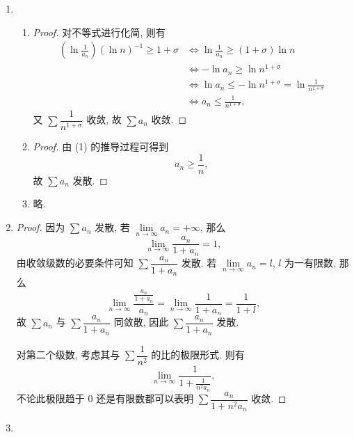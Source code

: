 \documentclass[a4paper, 11pt]{ctexart}
\begin{document}
\begin{enumerate}
\begin{proof}
            当 $\delta = 0$ 时, 则有
            \[
                n^{-1/2}\sqrt{a_n} = \sqrt{\frac{a_n}{n}} = \sqrt{\frac1n\cdot a_n} \geq \frac{2}{n + \frac{1}{a_n}},    
            \]
            又因 $\sum a_n$ 收敛, 有极限 $\lim a_n = 0$, 故数列 $\{a_n\}$ 有界, 即 $a_n \leq M$, 那么
            \[
                \frac{2}{n + \frac{1}{a_n}} \geq \frac{2}{n + \frac{1}{M}}.    
            \]
            $\sum\dfrac{2}{n + \frac{1}{M}}$ 显然与 $\sum\dfrac1n$ 同敛散. 故 $\sum\sqrt{\dfrac{a_n}{n}}$ 发散.
        \end{proof}
    \item %
        \begin{enumerate}[(1)]
            \item %
                \begin{proof}
                    对不等式进行化简, 则有
                    \begin{align*}
                        \left(\ln\frac{1}{a_n}\right)(\ln n)^{-1} \geq 1 + \sigma &\Leftrightarrow \ln\frac{1}{a_n} \geq (1+\sigma)\ln n \\
                        &\Leftrightarrow -\ln a_n \geq \ln n^{1+\sigma} \\
                        &\Leftrightarrow \ln a_n \leq -\ln n^{1+\sigma} = \ln\frac{1}{n^{1+\sigma}} \\
                        &\Leftrightarrow a_n \leq \frac{1}{n^{1+\sigma}},
                    \end{align*}
                    又 $\sum\dfrac{1}{n^{1+\sigma}}$ 收敛, 故 $\sum a_n$ 收敛.
                \end{proof}
            \item %
                \begin{proof}
                    由 (1) 的推导过程可得到
                    \[
                        a_n \geq \frac1n,    
                    \]
                    故 $\sum a_n$ 发散.
                \end{proof}
            \item %
                略.
        \end{enumerate}
    \item %
        \begin{proof}
            因为 $\sum a_n$ 发散, 若 $\lim\limits_{n\to\infty}a_n = +\infty$, 那么
            \[
                \lim_{n\to\infty}\frac{a_n}{1+a_n} = 1,   
            \]
            由收敛级数的必要条件可知 $\sum\dfrac{a_n}{1+a_n}$ 发散. 若 $\lim\limits_{n\to\infty}a_n = l$, $l$ 为一有限数, 那么
            \[
                \lim_{n\to\infty}\frac{\frac{a_n}{1+a_n}}{a_n} = \lim_{n\to\infty}\frac{1}{1+a_n} = \frac{1}{1+l},
            \]
            故 $\sum a_n$ 与 $\sum \dfrac{a_n}{1+a_n}$ 同敛散, 因此 $\sum\dfrac{a_n}{1+a_n}$ 发散.

            对第二个级数, 考虑其与 $\sum\dfrac{1}{n^2}$ 的比的极限形式. 则有
            \[
                \lim_{n\to\infty}\frac{1}{1 + \frac{1}{n^2a_n}},    
            \]
            不论此极限趋于 $0$ 还是有限数都可以表明 $\sum\dfrac{a_n}{1 + n^2a_n}$ 收敛.
        \end{proof}
    \item %
\end{enumerate}
\end{document}
